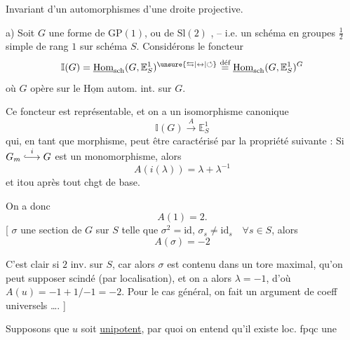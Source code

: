 Invariant d'un automorphismes d'une droite projective.

a) Soit $G$ une forme de $\mathrm{GP}(1)$, ou de $\mathrm{Sl}(2)$ , -- i.e. un schéma en groupes $\frac12$ simple de rang $1$ sur schéma $S$. Considérons le foncteur
\[
\mathbb I(G)=\underline{\mathrm{Hom}}_{\rm sch}(G,\mathbb E^1_S)^{\unsure{\leftrightarrows|\leftrightarrow|\circlearrowleft}}
\overset{\text{déf}}{=}\underline{\mathrm{Hom}}_{\rm sch}(G,\mathbb E^1_S)^G
\]
où $G$ opère sur le $\underline{\mathrm{Hom}}$  autom. int. sur $G$.

Ce foncteur est représentable,  et on a un isomorphisme canonique
\[
\mathbb I(G)\xrightarrow{A}\mathbb E^1_S
\]
qui, en tant que morphisme, peut être caractérisé par la propriété suivante : Si $G_m\overset{i}{\lhook\joinrel\longrightarrow}G$ est un monomorphisme, alors
\[
A(i(\lambda))=\lambda+\lambda^{-1}
\]
et itou après tout chgt de base.

 On a donc
\[
A(1)=2.
\]
[    $\sigma$  une section de $G$ sur $S$ telle que $\sigma^2=\mathrm{id}$, $\sigma_s\ne\mathrm{id}_s\quad\forall s\in S$,  alors
\[
A(\sigma)=-2
\]

C'est clair si $2$ inv. sur $S$, car alors $\sigma$ est contenu dans un  tore maximal,  qu'on peut supposer scindé (par localisation), et on a alors $\lambda=-1$, d'où $A(u)=-1+1/{-1}=-2$. Pour le cas général, on fait un argument de coeff universels \ldots. ]

 Supposons que $u$ soit \uline{unipotent}, par quoi on entend qu'il existe loc. fpqc une 
